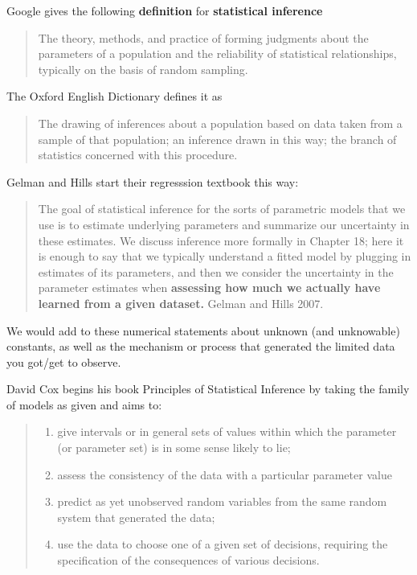 \documentclass[]{book}
\providecommand{\tightlist}{%
  \setlength{\itemsep}{0pt}\setlength{\parskip}{0pt}}
\begin{document}
Google gives the following \textbf{definition} for \textbf{statistical inference}

\begin{quote}
The theory, methods, and practice of forming judgments about the parameters of a population and the reliability of statistical relationships, typically on the basis of random sampling.
\end{quote}

The Oxford English Dictionary defines it as

\begin{quote}
The drawing of inferences about a population based on data taken from a sample of that population; an inference drawn in this way; the branch of statistics concerned with this procedure.
\end{quote}

Gelman and Hills start their regresssion textbook this way:

\begin{quote}
The goal of statistical inference for the sorts of parametric models that we use is to estimate underlying parameters and summarize our uncertainty in these estimates. We discuss inference more formally in Chapter 18; here it is enough to say that we typically understand a fitted model by plugging in estimates of its parameters, and then we consider the uncertainty in the parameter estimates when \textbf{assessing how much we actually have learned from a given dataset.} Gelman and Hills 2007.
\end{quote}

We would add to these numerical statements about unknown (and unknowable) constants, as well as the mechanism or process that generated the limited data you got/get to observe.

David Cox begins his book Principles of Statistical Inference
by taking the family of models as given and aims to:

\begin{quote}
\begin{enumerate}
\def\labelenumi{\arabic{enumi}.}
\tightlist
\item
  give intervals or in general sets of values within which the parameter (or parameter set) is in some sense likely to lie;
\item
  assess the consistency of the data with a particular parameter value
\item
  predict as yet unobserved random variables from the same random system that generated the data;
\item
  use the data to choose one of a given set of decisions, requiring the specification of the consequences of various decisions.
\end{enumerate}
\end{quote}
\end{document}
